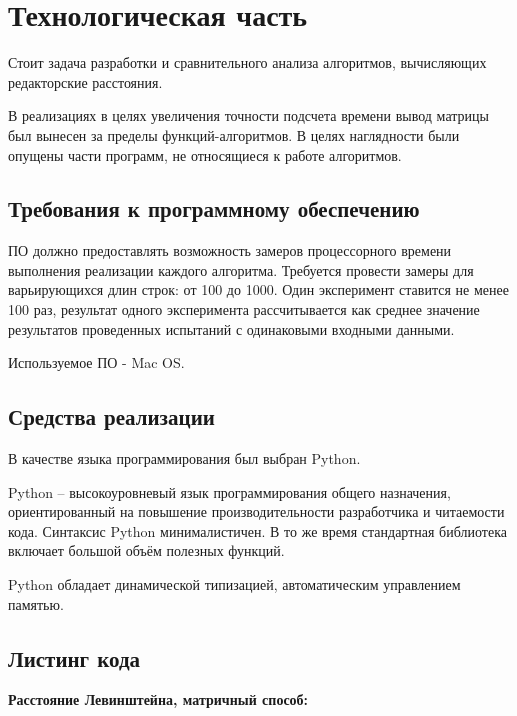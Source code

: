 \documentclass[a4paper,14pt]{article} %
\begin{document}
    \newpage

        \section{Технологическая часть}
        
        \hfill
        
        Стоит задача разработки и сравнительного анализа алгоритмов, вычисляющих редакторские расстояния. 
        \hfill
        
        В реализациях в целях увеличения точности подсчета времени вывод матрицы был вынесен за пределы функций-алгоритмов. В целях наглядности были опущены части программ, не относящиеся к работе алгоритмов.
        
        \subsection{Требования к программному обеспечению}
        \hfill
        
        ПО должно предоставлять возможность замеров процессорного времени выполнения реализации каждого алгоритма. Требуется провести замеры для варьирующихся длин строк: от 100 до 1000. Один эксперимент ставится не менее 100 раз, результат одного эксперимента рассчитывается как среднее значение результатов проведенных испытаний с одинаковыми входными данными.
        \hfill
        
        Используемое ПО - Mac OS. 
        \subsection{Средства реализации}
        \hfill
        
        В качестве языка программирования был выбран Python. 
        \hfill
        
        Python -- высокоуровневый язык программирования общего назначения, ориентированный на повышение производительности разработчика и читаемости кода. Синтаксис Python минималистичен. В то же время стандартная библиотека включает большой объём полезных функций.
        \hfill
        
        Python обладает динамической типизацией, автоматическим управлением памятью.
        
        \subsection{Листинг кода}
        \textbf{Расстояние Левинштейна, матричный способ: }
        
\end{document}
